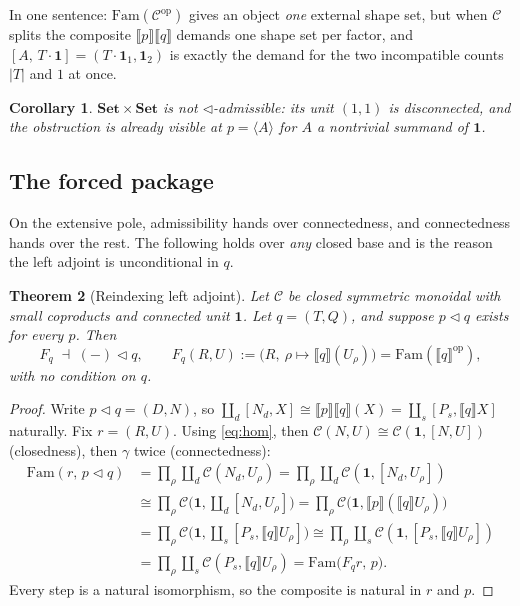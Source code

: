 \documentclass[11pt]{amsart}
\theoremstyle{plain}
\newtheorem{theorem}{Theorem}[section]
\newtheorem{corollary}[theorem]{Corollary}
\theoremstyle{definition}
\newcommand{\C}{\mathcal{C}}
\newcommand{\Fam}{\mathrm{Fam}}
\newcommand{\ext}[1]{\llbracket #1 \rrbracket}
\newcommand{\Setb}{\mathbf{Set}}
\newcommand{\op}{\mathrm{op}}
\newcommand{\comp}{\mathbin{\triangleleft}}
\newcommand{\one}{\mathbf{1}}
\newcommand{\gena}[1]{\langle #1 \rangle}
\begin{document}
In one sentence: $\Fam(\C^{\op})$ gives an object \emph{one} external shape set, but when $\C$ splits
the composite $\ext p\ext q$ demands one shape set per factor, and $[A,\,T\cdot\one]=(T\cdot\one_1,
\one_2)$ is exactly the demand for the two incompatible counts $|T|$ and $1$ at once.

\begin{corollary}\label{cor:setxset}
$\Setb\times\Setb$ is not $\comp$-admissible: its unit $(1,1)$ is disconnected, and the obstruction
is already visible at $p=\gena{A}$ for $A$ a nontrivial summand of $\one$.
\end{corollary}

\subsection{The forced package}

On the extensive pole, admissibility hands over connectedness, and connectedness hands over the rest.
The following holds over \emph{any} closed base and is the reason the left adjoint is unconditional
in $q$.

\begin{theorem}[Reindexing left adjoint]\label{thm:leftadj}
Let $\C$ be closed symmetric monoidal with small coproducts and connected unit $\one$. Let
$q=(T,Q)$, and suppose $p\comp q$ exists for every $p$. Then
\[
   F_q\;\dashv\;({-})\comp q,\qquad F_q(R,U):=\big(R,\ \rho\mapsto\ext q(U_\rho)\big)=\Fam(\ext q^{\op}),
\]
with no condition on $q$.
\end{theorem}
\begin{proof}
Write $p\comp q=(D,N)$, so $\coprod_d[N_d,X]\cong\ext p\ext q(X)=\coprod_s[P_s,\ext q X]$ naturally.
Fix $r=(R,U)$. Using \eqref{eq:hom}, then $\C(N,U)\cong\C(\one,[N,U])$ (closedness), then $\gamma$
twice (connectedness):
\[
\begin{aligned}
   \Fam(r,\,p\comp q)
   &=\prod_\rho\coprod_{d}\C(N_d,U_\rho)
    =\prod_\rho\coprod_{d}\C(\one,[N_d,U_\rho])\\
   &\cong\prod_\rho\C\Big(\one,\coprod_d[N_d,U_\rho]\Big)
    =\prod_\rho\C\big(\one,\ext p(\ext q U_\rho)\big)\\
   &=\prod_\rho\C\Big(\one,\coprod_s[P_s,\ext q U_\rho]\Big)
    \cong\prod_\rho\coprod_s\C(\one,[P_s,\ext q U_\rho])\\
   &=\prod_\rho\coprod_s\C(P_s,\ext q U_\rho)
    =\Fam\big(F_q r,\,p\big).
\end{aligned}
\]
Every step is a natural isomorphism, so the composite is natural in $r$ and $p$.
\end{proof}
\end{document}
